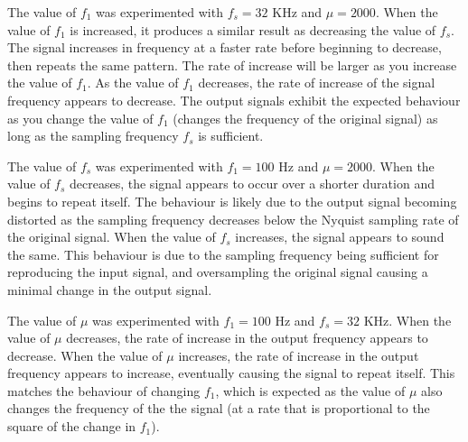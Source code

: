 \documentclass[12pt]{article}
\begin{document}
\begin{enumerate}
    The value of $f_1$ was experimented with $f_s = 32$ KHz and $\mu = 2000$. When the value of $f_1$ is increased, it produces a similar result as decreasing the value of $f_s$. The signal increases in frequency at a faster rate before beginning to decrease, then repeats the same pattern. The rate of increase will be larger as you increase the value of $f_1$. As the value of $f_1$ decreases, the rate of increase of the signal frequency appears to decrease. The output signals exhibit the expected behaviour as you change the value of $f_1$ (changes the frequency of the original signal) as long as the sampling frequency $f_s$ is sufficient.

    The value of $f_s$ was experimented with $f_1 = 100$ Hz and $\mu = 2000$. When the value of $f_s$ decreases, the signal appears to occur over a shorter duration and begins to repeat itself. The behaviour is likely due to the output signal becoming distorted as the sampling frequency decreases below the Nyquist sampling rate of the original signal.  When the value of $f_s$ increases, the signal appears to sound the same. This behaviour is due to the sampling frequency being sufficient for reproducing the input signal, and oversampling the original signal causing a minimal change in the output signal.

    The value of $\mu$ was experimented with $f_1 = 100$ Hz and $f_s = 32$ KHz. When the value of $\mu$ decreases, the rate of increase in the output frequency appears to decrease. When the value of $\mu$ increases, the rate of increase in the output frequency appears to increase, eventually causing the signal to repeat itself. This matches the behaviour of changing $f_1$, which is expected as the value of $\mu$ also changes the frequency of the the signal (at a rate that is proportional to the square of the change in $f_1$).  
\end{enumerate}
\end{document}
